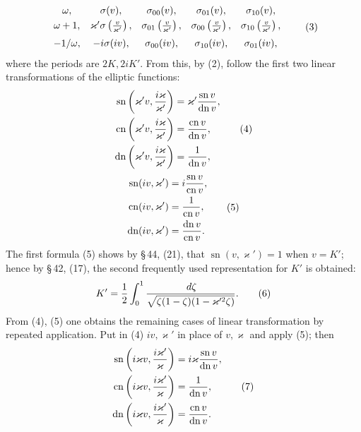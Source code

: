 \documentclass[11pt]{article}
\providecommand{\dd}{\,d}
\providecommand{\sn}{\operatorname{sn}}
\providecommand{\cn}{\operatorname{cn}}
\providecommand{\dn}{\operatorname{dn}}
\begin{document}
\begin{equation}
\begin{array}{ccccc}
\omega,& \sigma(v),&\sigma_{00}(v),&\sigma_{01}(v),&\sigma_{10}(v),\\[0.3em]
\omega+1,&\varkappa'\sigma\left({v\over\varkappa'}\right),&
\sigma_{01}\left({v\over\varkappa'}\right),&
\sigma_{00}\left({v\over\varkappa'}\right),&
\sigma_{10}\left({v\over\varkappa'}\right),\\[0.6em]
-1/\omega,&-i\sigma(iv),&\sigma_{00}(iv),&\sigma_{10}(iv),&\sigma_{01}(iv),
\end{array}
\tag{3}
\end{equation}
where the periods are $2K,2iK'$. From this, by (2), follow the first two linear transformations of the elliptic functions:
\begin{equation}
\begin{aligned}
\sn\left(\varkappa'v,{i\varkappa\over\varkappa'}\right)&=\varkappa'{\sn v\over\dn v},\\
\cn\left(\varkappa'v,{i\varkappa\over\varkappa'}\right)&={\cn v\over\dn v},\\
\dn\left(\varkappa'v,{i\varkappa\over\varkappa'}\right)&={1\over\dn v},
\end{aligned}
\tag{4}
\end{equation}
\begin{equation}
\begin{aligned}
\sn(iv,\varkappa')&=i{\sn v\over\cn v},\\
\cn(iv,\varkappa')&={1\over\cn v},\\
\dn(iv,\varkappa')&={\dn v\over\cn v}.
\end{aligned}
\tag{5}
\end{equation}
The first formula (5) shows by \S\,44, (21), that $\sn(v,\varkappa')=1$ when $v=K'$; hence by \S\,42, (17), the second frequently used representation for $K'$ is obtained:
\begin{equation}
K'={1\over2}\int_0^1 {\dd\zeta\over\sqrt{\zeta(1-\zeta)(1-\varkappa'^2\zeta)}}.
\tag{6}
\end{equation}
From (4), (5) one obtains the remaining cases of linear transformation by repeated application. Put in (4) $iv,\varkappa'$ in place of $v,\varkappa$ and apply (5); then
\begin{equation}
\begin{aligned}
\sn\left(i\varkappa v,{i\varkappa'\over\varkappa}\right)&=i\varkappa{\sn v\over\dn v},\\
\cn\left(i\varkappa v,{i\varkappa'\over\varkappa}\right)&={1\over\dn v},\\
\dn\left(i\varkappa v,{i\varkappa'\over\varkappa}\right)&={\cn v\over\dn v}.
\end{aligned}
\tag{7}
\end{equation}
\end{document}
